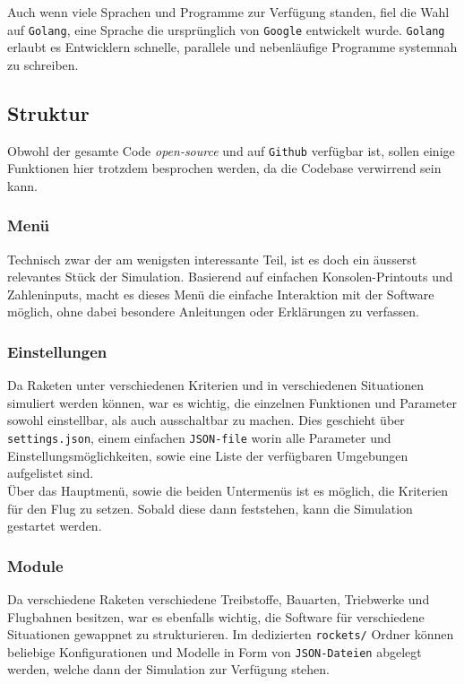 \documentclass[11pt]{article}
\begin{document}
Auch wenn viele Sprachen und Programme zur Verfügung standen, fiel die Wahl auf
\texttt{Golang}, eine Sprache die ursprünglich von \texttt{Google} entwickelt wurde. \texttt{Golang}
erlaubt es Entwicklern schnelle, parallele und nebenläufige Programme systemnah
zu schreiben.
\subsection{Struktur}
\label{sec:orga57a673}
Obwohl der gesamte Code \emph{open-source} und auf \texttt{Github} verfügbar ist, sollen einige
Funktionen hier trotzdem besprochen werden, da die Codebase verwirrend sein
kann.
\subsubsection{Menü}
\label{sec:org112ab39}
Technisch zwar der am wenigsten interessante Teil, ist es doch ein äusserst
relevantes Stück der Simulation. Basierend auf einfachen Konsolen-Printouts und
Zahleninputs, macht es dieses Menü die einfache Interaktion mit der Software
möglich, ohne dabei besondere Anleitungen oder Erklärungen zu verfassen. \\
\subsubsection{Einstellungen}
\label{sec:org2b15879}
Da Raketen unter verschiedenen Kriterien und in verschiedenen Situationen
simuliert werden können, war es wichtig, die einzelnen Funktionen und Parameter
sowohl einstellbar, als auch ausschaltbar zu machen. Dies geschieht über
\texttt{settings.json}, einem einfachen \texttt{JSON-file} worin alle Parameter und
Einstellungsmöglichkeiten, sowie eine Liste der verfügbaren Umgebungen
aufgelistet sind.\\
Über das Hauptmenü, sowie die beiden Untermenüs ist es möglich, die Kriterien
für den Flug zu setzen. Sobald diese dann feststehen, kann die Simulation
gestartet werden.
\subsubsection{Module}
\label{sec:org6ded60f}
Da verschiedene Raketen verschiedene Treibstoffe, Bauarten, Triebwerke und
Flugbahnen besitzen, war es ebenfalls wichtig, die Software für verschiedene
Situationen gewappnet zu strukturieren. Im dedizierten \texttt{rockets/} Ordner können
beliebige Konfigurationen und Modelle in Form von \texttt{JSON-Dateien} abgelegt werden,
welche dann der Simulation zur Verfügung stehen.
\end{document}
